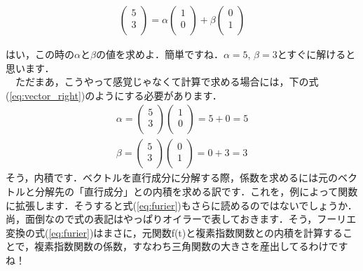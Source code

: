 \documentclass[11pt,a4paper,uplatex]{ujreport} 	%
\begin{document}
\begin{eqnarray}
\left( \begin{array}{cc} 5\\ 3\\ \end{array} \right) = \alpha \left(\begin{array}{cc} 1\\ 0\\ \end{array} \right) + \beta \left( \begin{array}{cc} 0\\ 1\\ \end{array} \right)
\label{eq:vector}
\end{eqnarray}

はい，この時の$\alpha$と$\beta$の値を求めよ．簡単ですね．$\alpha = 5$, $\beta = 3$とすぐに解けると思います．\\
　ただまあ，こうやって感覚じゃなくて計算で求める場合には，下の式(\ref{eq:vector_right})のようにする必要があります．
\begin{eqnarray}
\alpha = \left(\begin{array}{cc} 5\\ 3\\ \end{array} \right)\left(\begin{array}{cc} 1\\ 0\\ \end{array} \right) = 5+0=5 \nonumber \\
\beta =  \left(\begin{array}{cc} 5\\ 3\\ \end{array} \right)\left(\begin{array}{cc} 0\\ 1\\ \end{array} \right) =0+3=3
\label{eq:vector_right}
\end{eqnarray}
そう，内積です．ベクトルを直行成分に分解する際，係数を求めるには元のベクトルと分解先の「直行成分」との内積を求める訳です．これを，例によって関数に拡張します．そうすると式(\ref{eq:furier})もさらに読めるのではないでしょうか．尚，面倒なので式の表記はやっぱりオイラーで表しておきます．そう，フーリエ変換の式(\ref{eq:furier})はまさに，元関数f(t)と複素指数関数との内積を計算することで，複素指数関数の係数，すなわち三角関数の大きさを産出してるわけですね！\\
\end{document}
